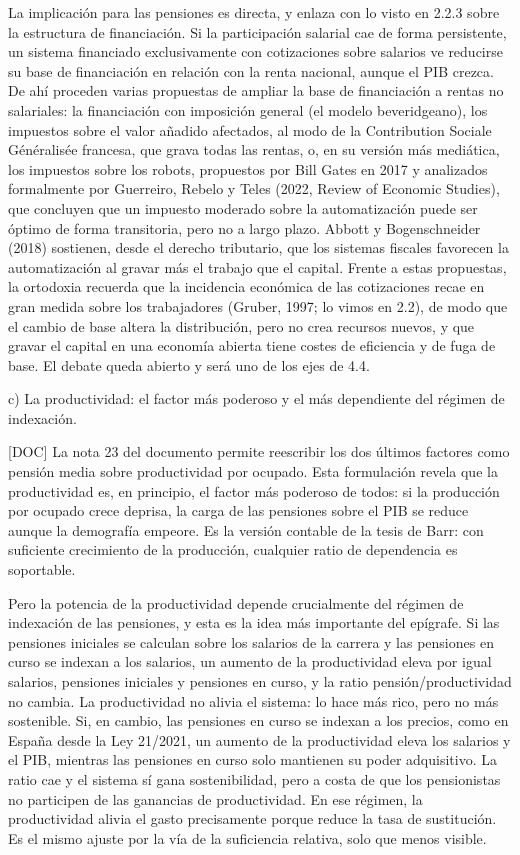 \documentclass[10pt,a4paper]{article}
\begin{document}
La implicación para las pensiones es directa, y enlaza con lo visto en 2.2.3 sobre la estructura de financiación. Si la participación salarial cae de forma persistente, un sistema financiado exclusivamente con cotizaciones sobre salarios ve reducirse su base de financiación en relación con la renta nacional, aunque el PIB crezca. De ahí proceden varias propuestas de ampliar la base de financiación a rentas no salariales: la financiación con imposición general (el modelo beveridgeano), los impuestos sobre el valor añadido afectados, al modo de la Contribution Sociale Généralisée francesa, que grava todas las rentas, o, en su versión más mediática, los impuestos sobre los robots, propuestos por Bill Gates en 2017 y analizados formalmente por Guerreiro, Rebelo y Teles (2022, Review of Economic Studies), que concluyen que un impuesto moderado sobre la automatización puede ser óptimo de forma transitoria, pero no a largo plazo. Abbott y Bogenschneider (2018) sostienen, desde el derecho tributario, que los sistemas fiscales favorecen la automatización al gravar más el trabajo que el capital. Frente a estas propuestas, la ortodoxia recuerda que la incidencia económica de las cotizaciones recae en gran medida sobre los trabajadores (Gruber, 1997; lo vimos en 2.2), de modo que el cambio de base altera la distribución, pero no crea recursos nuevos, y que gravar el capital en una economía abierta tiene costes de eficiencia y de fuga de base. El debate queda abierto y será uno de los ejes de 4.4.

c) La productividad: el factor más poderoso y el más dependiente del régimen de indexación.

[DOC] La nota 23 del documento permite reescribir los dos últimos factores como pensión media sobre productividad por ocupado. Esta formulación revela que la productividad es, en principio, el factor más poderoso de todos: si la producción por ocupado crece deprisa, la carga de las pensiones sobre el PIB se reduce aunque la demografía empeore. Es la versión contable de la tesis de Barr: con suficiente crecimiento de la producción, cualquier ratio de dependencia es soportable.

Pero la potencia de la productividad depende crucialmente del régimen de indexación de las pensiones, y esta es la idea más importante del epígrafe. Si las pensiones iniciales se calculan sobre los salarios de la carrera y las pensiones en curso se indexan a los salarios, un aumento de la productividad eleva por igual salarios, pensiones iniciales y pensiones en curso, y la ratio pensión/productividad no cambia. La productividad no alivia el sistema: lo hace más rico, pero no más sostenible. Si, en cambio, las pensiones en curso se indexan a los precios, como en España desde la Ley 21/2021, un aumento de la productividad eleva los salarios y el PIB, mientras las pensiones en curso solo mantienen su poder adquisitivo. La ratio cae y el sistema sí gana sostenibilidad, pero a costa de que los pensionistas no participen de las ganancias de productividad. En ese régimen, la productividad alivia el gasto precisamente porque reduce la tasa de sustitución. Es el mismo ajuste por la vía de la suficiencia relativa, solo que menos visible.
\end{document}
